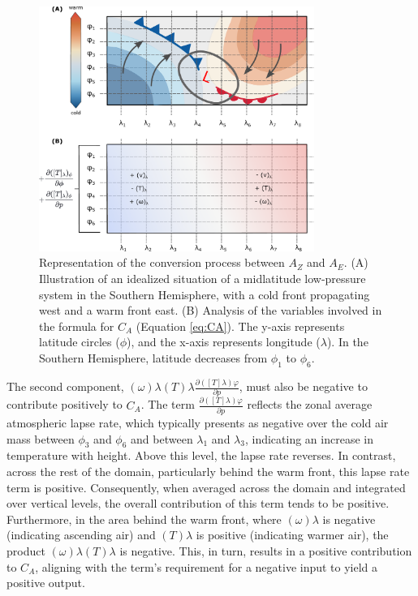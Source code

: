 \begin{figure}[h]
\begin{center}
\includegraphics[width=0.8\textwidth]{fig/Ca.pdf}
\caption[$C_A$ - Representation]{Representation of the conversion process between $A_Z$ and $A_E$. (A) Illustration of an idealized situation of a midlatitude low-pressure system in the Southern Hemisphere, with a cold front propagating west and a warm front east. (B) Analysis of the variables involved in the formula for $C_A$ (Equation \ref{eq:CA}). The y-axis represents latitude circles ($\phi$), and the x-axis represents longitude ($\lambda$). In the Southern Hemisphere, latitude decreases from $\phi_1$ to $\phi_6$.}
\label{fig:Ca}
\end{center}
\end{figure}

The second component, $(\omega)\lambda (T)\lambda \frac{\partial ([T]\lambda)\varphi}{\partial p}$, must also be negative to contribute positively to $C_A$. The term $\frac{\partial ([T]\lambda)\varphi}{\partial p}$ reflects the zonal average atmospheric lapse rate, which typically presents as negative over the cold air mass between $\phi_3$ and $\phi_6$ and between $\lambda_1$ and $\lambda_3$, indicating an increase in temperature with height. Above this level, the lapse rate reverses. In contrast, across the rest of the domain, particularly behind the warm front, this lapse rate term is positive. Consequently, when averaged across the domain and integrated over vertical levels, the overall contribution of this term tends to be positive. Furthermore, in the area behind the warm front, where $(\omega)\lambda$ is negative (indicating ascending air) and $(T)\lambda$ is positive (indicating warmer air), the product $(\omega)\lambda (T)\lambda$ is negative. This, in turn, results in a positive contribution to $C_A$, aligning with the term's requirement for a negative input to yield a positive output.

